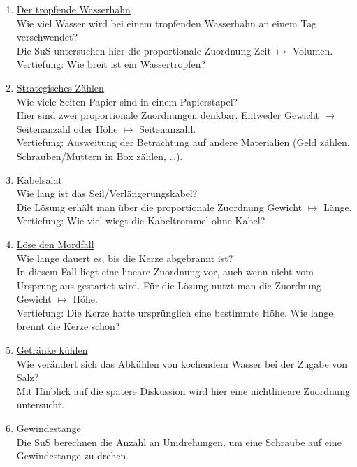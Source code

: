 \documentclass[../main.tex]{subfiles}
\begin{document}
\begin{enumerate}
    \item \underline{Der tropfende Wasserhahn} \\
        Wie viel Wasser wird bei einem tropfenden Wasserhahn an einem Tag verschwendet?\\
        Die SuS untersuchen hier die proportionale Zuordnung Zeit $\mapsto$ Volumen.\\
       \colorbox{tablegray1}{Vertiefung:} Wie breit ist ein Wassertropfen?
    \item \underline{Strategisches Zählen} \\
        Wie viele Seiten Papier sind in einem Papierstapel?\\ 
        Hier sind zwei proportionale Zuordnungen denkbar. Entweder Gewicht $\mapsto$ Seitenanzahl oder Höhe $\mapsto$ Seitenanzahl.\\
        \colorbox{tablegray1}{Vertiefung:} Ausweitung der Betrachtung auf andere Materialien (Geld zählen, Schrauben/Muttern in Box zählen, \ldots). 
    \item \underline{Kabelsalat}\\
        Wie lang ist das Seil/Verlängerungskabel?\\ 
        Die Lösung erhält man über die proportionale Zuordnung Gewicht $\mapsto$ Länge.\\ 
        \colorbox{tablegray1}{Vertiefung:} Wie viel wiegt die Kabeltrommel ohne Kabel?
    \item \underline{Löse den Mordfall} \\
        Wie lange dauert es, bis die Kerze abgebrannt ist?\\
        In diesem Fall liegt eine lineare Zuordnung vor, auch wenn nicht vom Ursprung aus gestartet wird. Für die Lösung nutzt man die Zuordnung Gewicht $\mapsto$ Höhe.\\
        \colorbox{tablegray1}{Vertiefung:}  Die Kerze hatte ursprünglich eine bestimmte Höhe. Wie lange brennt die Kerze schon?  
    \item \underline{Getränke kühlen} \\
        Wie verändert sich das Abkühlen von kochendem Wasser bei der Zugabe von Salz?\\
        Mit Hinblick auf die spätere Diskussion wird hier eine nichtlineare Zuordnung untersucht.
    \item \underline{Gewindestange}\\
        Die SuS berechnen die Anzahl an Umdrehungen, um eine Schraube auf eine Gewindestange zu drehen.\\

\end{enumerate}
\end{document}
